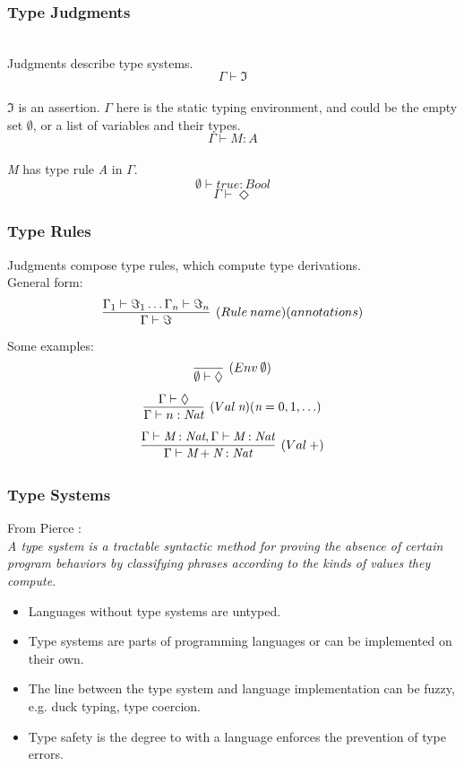 \documentclass{beamer}
\newcommand{\G}{\Gamma}
\newcommand{\entails}{\vdash}
\begin{document}
\begin{frame}
  \frametitle{Type Judgments}
  \\
  \vspace{20pt}
  Judgments describe type systems.\\
  \[ \G \entails \Im \]\\
  $\Im$ is an assertion. $\Gamma$ here is the static typing environment, and
  could be the empty set $\emptyset$, or a list of variables and their types.\\
  \[ \G \entails \textit{M} : \textit{A} \]\\
  \textit{M} has type rule \textit{A} in $\Gamma$.\\
  \[ \emptyset \entails \textit{true} : \textit{Bool} \]
  \[ \G \entails \Diamond \]
\end{frame}

\begin{frame}
  \frametitle{Type Rules}
  \vspace{20pt}
  Judgments compose type rules, which compute type derivations.\\
  \vspace{10pt}
  General form:
  \[ \infer[(Rule\:name)(annotations)]{\Gamma \entails \Im}{\Gamma_1 \entails \Im_1
      \ldots \Gamma_n \entails \Im_n} \]
  Some examples:
  \vspace{2pt}
  \[ \infer[(Env\:\emptyset)]{\emptyset \entails \Diamond}{} \]
  \vspace{2pt}
  \[ \infer[(Val\:\textit{n})(\textit{n} = 0,1,\ldots)]{\G \entails n :
      \textit{Nat}}{\G \entails \Diamond} \]
  \vspace{2pt}
  \[ \infer[(Val\:+)]{\G \entails \textit{M} + \textit{N} : \textit{Nat}}{\G
      \entails \textit{M} : \textit{Nat}, \G \entails \textit{M} : \textit{Nat}} \]
\end{frame}

\begin{frame}
  \frametitle{Type Systems}
  From Pierce \cite{TAPL}:\\
  \textit{A type system is a tractable syntactic method for proving the absence
    of certain program behaviors by classifying phrases according to the kinds
    of values they compute.}
  \vspace{20pt}
  \begin{itemize}
    \item Languages without type systems are untyped.
    \item Type systems are parts of programming languages or can be implemented
      on their own.
    \item The line between the type system and language implementation can be
      fuzzy, e.g. duck typing, type coercion.
    \item Type safety is the degree to with a language enforces the prevention
      of type errors.
  \end{itemize}
\end{frame}
\end{document}

